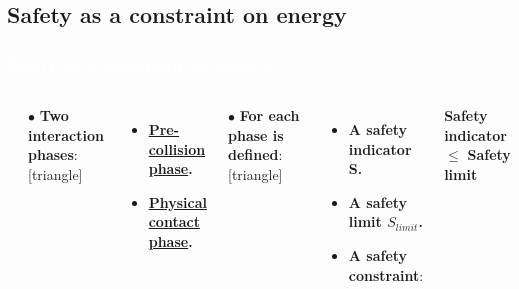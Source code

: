 \subsection{Safety as a constraint on energy}
\begin{frame}
\frametitle{{\textcolor{white}{Safety as a constraint on energy}}}
\vspace{-4mm}
\begin{columns}
    \column{\dimexpr\paperwidth-400pt}
    
\column{.6\paperwidth}
\begin{center}
\end{center}




\column{.4\paperwidth}
$\bullet$ \textbf{Two interaction phases}: 
[triangle]
\begin{itemize}
\setlength\itemsep{3mm}
\item \textbf{{\color{violet}\underline{Pre-collision phase}.}} 
\item \textbf{{\color{violet}\underline{Physical contact phase}.}}
\end{itemize}
\vspace{6mm} 
$\bullet$  \textbf{For each phase is defined}:  
[triangle]
\begin{itemize}
\setlength\itemsep{3mm}
\item \textbf{{\color{teal}\textbf{A safety indicator} S.}} 
\item \textbf{{\color{red}\textbf{A safety limit $S_{limit}$.}}} 
\item \textbf{A safety constraint}:
\end{itemize} 
\vspace{-3mm}
\begin{center}     
{\color{teal}\textbf{Safety indicator}} $\leq$ {\color{red}\textbf{Safety limit}}    
\end{center}



\end{columns}
\end{frame}









